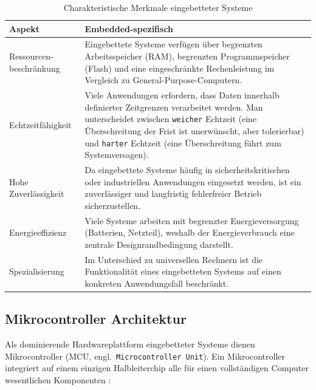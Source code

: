 \begin{table}[htbp]
    \centering
    \label{tab:embedded-merkmale}
    \begin{tabular}{|p{}|p{}|}
        \hline
        \textbf{Aspekt} & \textbf{Embedded-spezifisch} \\
        \hline
        Ressourcen-beschränkung & Eingebettete Systeme verfügen über begrenzten Arbeitsspeicher (RAM), begrenzten Programmspeicher (Flash) und eine eingeschränkte Rechenleistung im Vergleich zu General-Purpose-Computern. \\
        \hline
        Echtzeitfähigkeit & Viele Anwendungen erfordern, dass Daten innerhalb definierter Zeitgrenzen verarbeitet werden. Man unterscheidet zwischen \texttt{weicher} Echtzeit (eine Überschreitung der Frist ist unerwünscht, aber tolerierbar) und \texttt{harter} Echtzeit (eine Überschreitung führt zum Systemversagen). \\
        \hline
        Hohe \newline Zuverlässigkeit & Da eingebettete Systeme häufig in sicherheitskritischen oder industriellen Anwendungen eingesetzt werden, ist ein zuverlässiger und langfristig fehlerfreier Betrieb sicherzustellen. \\
        \hline
        Energieeffizienz & Viele Systeme arbeiten mit begrenzter Energieversorgung (Batterien, Netzteil), weshalb der Energieverbrauch eine zentrale Designrandbedingung darstellt. \\
        \hline
        Spezialisierung & Im Unterschied zu universellen Rechnern ist die Funktionalität eines eingebetteten Systems auf einen konkreten Anwendungsfall beschränkt. \\
        \hline
    \end{tabular}
    \caption{Charakteristische Merkmale eingebetteter Systeme \cite[S. ~3 ff.]{bernsteinMikrocontroller2026}}
\end{table}

\subsection{Mikrocontroller Architektur}\label{sub:mikrocontroller-architektur}

Als dominierende Hardwareplattform eingebetteter Systeme dienen Mikrocontroller (MCU, engl.\ \texttt{Microcontroller Unit}). Ein Mikrocontroller integriert auf einem einzigen Halbleiterchip alle für einen vollständigen Computer wesentlichen Komponenten \cite[S. ~3 ff.]{bernsteinMikrocontroller2026}:

